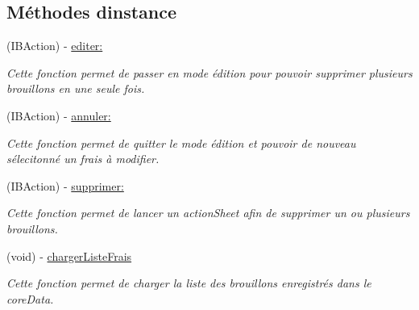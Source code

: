 \subsection*{Méthodes d\textquotesingle{}instance}
\begin{DoxyCompactItemize}
\item 
\hypertarget{interface_historique_table_view_controller_a4db13acf68af8360b21f41542d6052cd}{}(I\+B\+Action) -\/ \hyperlink{interface_historique_table_view_controller_a4db13acf68af8360b21f41542d6052cd}{editer\+:}\label{interface_historique_table_view_controller_a4db13acf68af8360b21f41542d6052cd}

\begin{DoxyCompactList}\small\item\em Cette fonction permet de passer en mode édition pour pouvoir supprimer plusieurs brouillons en une seule fois. \end{DoxyCompactList}\item 
\hypertarget{interface_historique_table_view_controller_a58ad1732131271938eaffa3d9c107129}{}(I\+B\+Action) -\/ \hyperlink{interface_historique_table_view_controller_a58ad1732131271938eaffa3d9c107129}{annuler\+:}\label{interface_historique_table_view_controller_a58ad1732131271938eaffa3d9c107129}

\begin{DoxyCompactList}\small\item\em Cette fonction permet de quitter le mode édition et pouvoir de nouveau sélecitonné un frais à modifier. \end{DoxyCompactList}\item 
\hypertarget{interface_historique_table_view_controller_a4d3ea35a84f32dc8d9e06b2e7dfad999}{}(I\+B\+Action) -\/ \hyperlink{interface_historique_table_view_controller_a4d3ea35a84f32dc8d9e06b2e7dfad999}{supprimer\+:}\label{interface_historique_table_view_controller_a4d3ea35a84f32dc8d9e06b2e7dfad999}

\begin{DoxyCompactList}\small\item\em Cette fonction permet de lancer un action\+Sheet afin de supprimer un ou plusieurs brouillons. \end{DoxyCompactList}\item 
\hypertarget{interface_historique_table_view_controller_aa369a11dac5efc2c7928e0167ab30bea}{}(void) -\/ \hyperlink{interface_historique_table_view_controller_aa369a11dac5efc2c7928e0167ab30bea}{charger\+Liste\+Frais}\label{interface_historique_table_view_controller_aa369a11dac5efc2c7928e0167ab30bea}

\begin{DoxyCompactList}\small\item\em Cette fonction permet de charger la liste des brouillons enregistrés dans le core\+Data. \end{DoxyCompactList}\end{DoxyCompactItemize}
